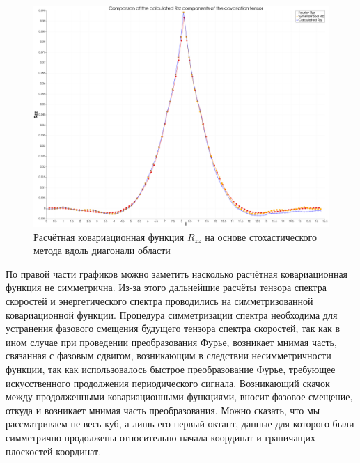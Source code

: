 \begin{figure}[ht] 
  \center
  \includegraphics [width=0.8\linewidth] {images/kriging/3components/diagonal_r33_zz.png}
  \caption{Расчётная ковариационная функция $R_{zz}$ на основе стохастического метода вдоль диагонали области } 
  \label{img:kriging_covariances_diagonal_r33_zz}  
\end{figure}

По правой части графиков можно заметить насколько расчётная ковариационная функция не симметрична. Из-за этого дальнейшие расчёты тензора спектра скоростей и энергетического спектра проводились на симметризованной ковариационной функции. Процедура симметризации спектра необходима для устранения фазового смещения будущего тензора спектра скоростей, так как в ином случае при проведении преобразования Фурье, возникает мнимая часть, связанная с фазовым сдвигом, возникающим в следствии несимметричности функции, так как использовалось быстрое преобразование Фурье, требующее искусственного продолжения периодического сигнала. Возникающий скачок между продолженными ковариационными функциями, вносит фазовое смещение, откуда и возникает мнимая часть преобразования. Можно сказать, что мы рассматриваем не весь куб, а лишь его первый октант, данные для которого были симметрично продолжены относительно начала координат и граничащих плоскостей координат. 

